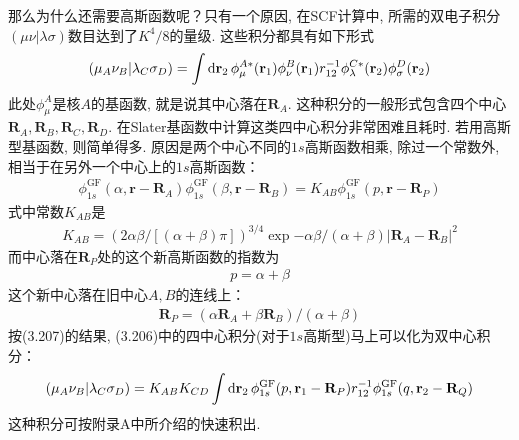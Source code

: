 那么为什么还需要高斯函数呢？只有一个原因, 在SCF计算中, 所需的双电子积分$(\mu\nu|\lambda\sigma)$数目达到了$K^4/8$的量级. 这些积分都具有如下形式
\begin{align}
(\mu_A\nu_B|\lambda_C\sigma_D) = \int\dd{r}_2\,\phi_\mu^{A*}(\bfr_1)\phi_\nu^B(\bfr_1)\twoe\phi_\lambda^{C*}(\bfr_2)\phi_\sigma^D(\bfr_2)
\end{align}
此处$\phi_\mu^A$是核$A$的基函数, 就是说其中心落在$\mathbf{R}_A$. 这种积分的一般形式包含四个中心$\mathbf{R}_A,\mathbf{R}_B,\mathbf{R}_C,\mathbf{R}_D$. 在Slater基函数中计算这类四中心积分非常困难且耗时. 若用高斯型基函数, 则简单得多. 原因是两个中心不同的$1s$高斯函数相乘, 除过一个常数外, 相当于在另外一个中心上的$1s$高斯函数：
\begin{align}
\label{3.207}
\phi_{1s}^\mathrm{GF}(\alpha,\mathbf{r-R}_A)\phi_{1s}^\mathrm{GF}(\beta,\mathbf{r-R}_B) = K_{AB}\phi_{1s}^\mathrm{GF}(p,\mathbf{r-R}_P)
\end{align}
式中常数$K_{AB}$是
\begin{align}
K_{AB} = (2\alpha\beta/[(\alpha+\beta)\pi])^{3/4}\exp{-\alpha\beta/(\alpha+\beta)|\mathbf{R}_A-\mathbf{R}_B|^2}
\end{align}
而中心落在$\mathbf{R}_P$处的这个新高斯函数的指数为
\begin{align}
p=\alpha+\beta
\end{align}
这个新中心落在旧中心$A,B$的连线上：
\begin{align}
\mathbf{R}_P = (\alpha\mathbf{R}_A+\beta\mathbf{R}_B)/(\alpha+\beta)
\end{align}
按(3.207)的结果, (3.206)中的四中心积分(对于$1s$高斯型)马上可以化为双中心积分：
\begin{align}
(\mu_A\nu_B|\lambda_C\sigma_D) =K_{AB}K_{CD} \int\dd{r}_2\,\phi_{1s}^\mathrm{GF}(p,\bfr_1-\mathbf{R}_P)\twoe\phi_{1s}^\mathrm{GF}(q,\bfr_2-\mathbf{R}_Q)
\end{align}
这种积分可按附录A中所介绍的快速积出.


